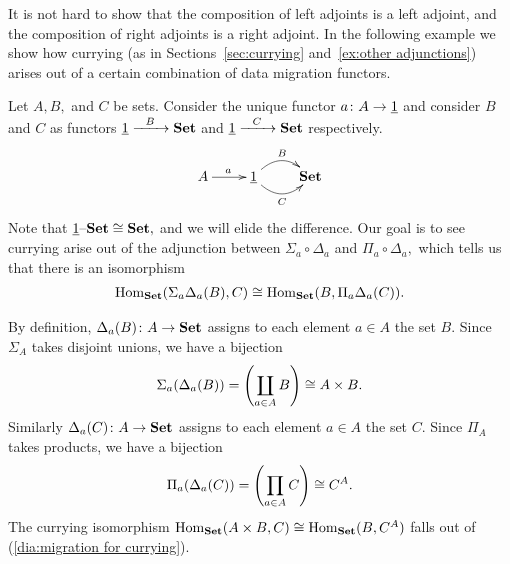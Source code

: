 \documentclass[CT4S-EN-RU]{subfiles}
\begin{document}
\begin{exampleRUS}
\end{exampleRUS}

\begin{blockENG}
It is not hard to show that the composition of left adjoints is a left adjoint, and the composition of right adjoints is a right adjoint. In the following example we show how currying (as in Sections~\ref{sec:currying} and~\ref{ex:other adjunctions}) arises out of a certain combination of data migration functors. 
\end{blockENG}

\begin{blockRUS}
\end{blockRUS}

\begin{exampleENG}
Let $A,B,$ and $C$ be sets. Consider the unique functor $a\colon A\rightarrow\underline{1}$ and consider $B$ and $C$ as functors $\underline{1}\xrightarrow{\ \ B\ \ }{\mathbf{Set}}$ and $\underline{1}\xrightarrow{\ \ C\ \ }{\mathbf{Set}}$ respectively. 
$$\xymatrix{A\ar[r]^a&\ul{1}\ar@/^1pc/[r]^B\ar@/_1pc/[r]_C&\Set}$$
Note that $\underline{1}{\text \textendash}{\mathbf{Set}}\cong{\mathbf{Set}},$ and we will elide the difference. Our goal is to see currying arise out of the adjunction between $\Sigma_a\circ\Delta_a$ and $\Pi_a\circ\Delta_a,$ which tells us that there is an isomorphism
\begin{align}\label{dia:migration for currying}
\operatorname{Hom}_{\mathbf{Set}}(\Sigma_a\Delta_a(B),C)\cong\operatorname{Hom}_{\mathbf{Set}}(B,\Pi_a\Delta_a(C)).
\end{align}

By definition, $\Delta_a(B)\colon A\rightarrow{\mathbf{Set}}$ assigns to each element $a\in A$ the set $B.$ Since $\Sigma_A$ takes disjoint unions, we have a bijection
$$\Sigma_a(\Delta_a(B))=\left(\coprod_{a\in A}B\right)\cong A\times B.$$ 
Similarly $\Delta_a(C)\colon A\rightarrow{\mathbf{Set}}$ assigns to each element $a\in A$ the set $C.$ Since $\Pi_A$ takes products, we have a bijection
$$\Pi_a(\Delta_a(C))=\left(\prod_{a\in A}C\right)\cong C^A.$$
The currying isomorphism $\operatorname{Hom}_{\mathbf{Set}}(A\times B,C)\cong\operatorname{Hom}_{\mathbf{Set}}(B,C^A)$ falls out of (\ref{dia:migration for currying}).
\end{exampleENG}

\begin{exampleRUS}
\end{exampleRUS}


\subsection{}
\end{document}
